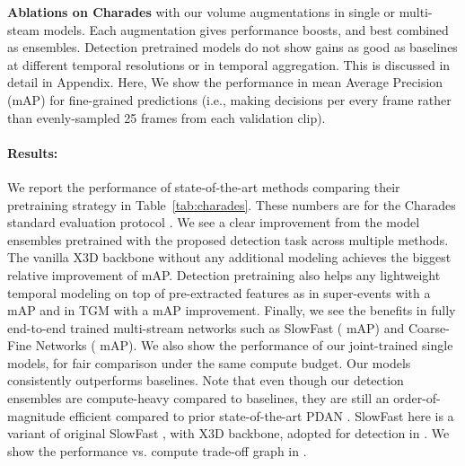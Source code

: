 \documentclass[letterpaper]{article} \usepackage{aaai23}  \usepackage{times}  \usepackage{helvet}  \usepackage{courier}  \usepackage[hyphens]{url}  \usepackage{graphicx} \urlstyle{rm} \def\UrlFont{\rm}  \usepackage{natbib}  \usepackage{caption} \frenchspacing  \setlength{\pdfpagewidth}{8.5in}  \setlength{\pdfpageheight}{11in}  \usepackage{algorithm}
\newcommand{\tref}[1]{Table~\ref{#1}}
\newcommand{\ch}{}
\begin{document}
\begin{table*}[t!]
		
		\caption{\textbf{Ablations on Charades} \cite{sigurdsson2016hollywood} with our volume augmentations in single or multi-steam models. Each augmentation gives performance boosts, and best combined as ensembles. Detection pretrained models do not show gains as good as baselines at different temporal resolutions or in temporal aggregation. This is discussed in detail in Appendix. Here, We show the performance in mean Average Precision (mAP) for fine-grained predictions (i.e., making decisions per every frame rather than evenly-sampled 25 frames from each validation clip).
		}
		\label{tab:ablations-main}
\end{table*}

\paragraph{Results:}
\label{subsubsec:main_results}
We report the performance of state-of-the-art methods comparing their pretraining strategy in \tref{tab:charades}. These numbers are for the Charades standard evaluation protocol \cite{sigurdsson2016hollywood}. We see a clear improvement from the model ensembles pretrained with the proposed detection task across multiple methods. The vanilla X3D \cite{feichtenhofer2020x3d} backbone without any additional modeling achieves the biggest relative improvement of  mAP. Detection pretraining also helps any lightweight temporal modeling on top of pre-extracted features as in super-events \cite{piergiovanni2018learning} with a  mAP and in TGM \cite{piergiovanni2019temporal} with a  mAP improvement. Finally, we see the benefits in fully end-to-end trained multi-stream networks such as SlowFast ( mAP) and Coarse-Fine Networks \cite{kahatapitiya2021coarse} ( mAP). \ch{We also show the performance of our joint-trained single models, for fair comparison under the same compute budget. Our models consistently outperforms baselines. Note that even though our detection ensembles are compute-heavy compared to baselines, they are still an order-of-magnitude efficient compared to prior state-of-the-art PDAN \cite{dai2021pdan}.}
SlowFast here is a variant of original SlowFast \cite{feichtenhofer2019slowfast}, with X3D \cite{feichtenhofer2020x3d} backbone, adopted for detection in \cite{kahatapitiya2021coarse}. We show the performance vs. compute trade-off graph in . 
\end{document}
